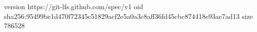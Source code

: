 version https://git-lfs.github.com/spec/v1
oid sha256:95499be1d470f72345c51829acf2e5a0a3c8aff36fd45cbc874418e93ae7ad13
size 786528
